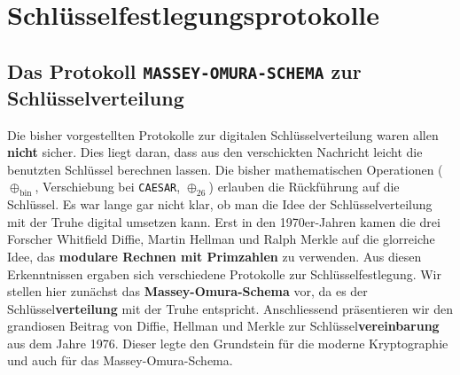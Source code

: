 
\toggletrue{image}
\toggletrue{imagehover}


\chapter{Schlüsselfestlegungsprotokolle}
\label{chapter-schluesselfestlegungsprotokolle}

\newcommand{\schluesselfestlegungsprotokollerestLernziele}{
\protect\begin{todolist}
\item Sie erklären das Protokoll \texttt{MASSEY-OMURA-SCHEMA} und wenden es an.
\item Sie erklären das Protokoll \texttt{DIFFIE-HELLMAN-MERKLE} und wenden es an.
\item Sie erklären, warum die Protokolle \texttt{MASSEY-OMURA-SCHEMA} und \texttt{DIFFIE-HELLMAN-MERKLE} als sicher eingestuft werden können.
\end{todolist}
}



\schluesselfestlegungsprotokolleLernziele

\section{Das Protokoll \texttt{MASSEY-OMURA-SCHEMA} zur Schlüsselverteilung}

Die bisher vorgestellten Protokolle zur digitalen Schlüsselverteilung waren allen \textbf{nicht} sicher. Dies liegt daran, dass aus den verschickten Nachricht leicht die benutzten Schlüssel berechnen lassen. Die bisher mathematischen Operationen ($\oplus_{\text{bin}}$, Verschiebung bei \texttt{CAESAR}, $\oplus_{26}$) erlauben die Rückführung auf die Schlüssel. Es war lange gar nicht klar, ob man die Idee der Schlüsselverteilung mit der Truhe digital umsetzen kann. Erst in den 1970er-Jahren kamen die drei Forscher Whitfield Diffie, Martin Hellman und Ralph Merkle auf die glorreiche Idee, das \textbf{modulare Rechnen mit Primzahlen} zu verwenden. Aus diesen Erkenntnissen ergaben sich verschiedene Protokolle zur Schlüsselfestlegung. Wir stellen hier zunächst das \textbf{Massey-Omura-Schema} vor, da es der Schlüssel\textbf{verteilung} mit der Truhe entspricht. Anschliessend präsentieren wir den grandiosen Beitrag von Diffie, Hellman und Merkle zur Schlüssel\textbf{vereinbarung} aus dem Jahre 1976. Dieser legte den Grundstein für die moderne Kryptographie und auch für das Massey-Omura-Schema.

